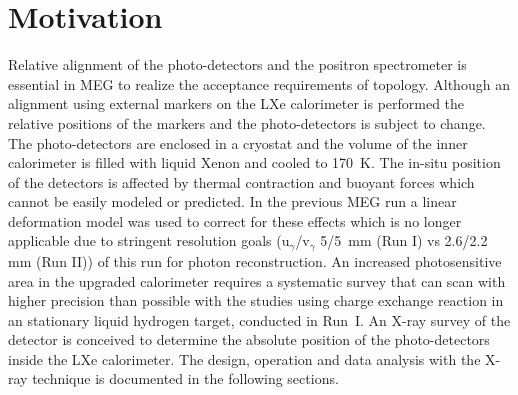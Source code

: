 \section{\label{motivation}Motivation}
Relative alignment of the photo-detectors and the positron
spectrometer is essential in MEG to realize the acceptance
requirements of \mueg topology.  Although an alignment
using external markers on the LXe calorimeter is performed the
relative positions of the markers and the photo-detectors is
subject to change. The photo-detectors are enclosed in a
cryostat and the volume of the inner 
calorimeter is filled with liquid Xenon and cooled to 170~K. 
The in-situ position of the
detectors is affected by thermal contraction and buoyant
forces which cannot be easily modeled or predicted. In the
previous MEG run a linear deformation model was used to
correct for these effects which is no longer applicable due
to stringent resolution goals\cite{megdesign,megproposal}
(u$_\gamma$/v$_\gamma$ 5/5~mm (Run I) vs 2.6/2.2 mm (Run II))
of this run for photon reconstruction.  An increased photosensitive
area in the upgraded calorimeter requires a systematic survey
that can scan with higher precision than possible with the
studies using charge exchange reaction \cex in an stationary
liquid hydrogen target, conducted in Run~I.  An X-ray survey of
the detector is conceived to determine the absolute position
of the photo-detectors inside the LXe calorimeter. The design,
operation and data analysis with the X-ray technique is
documented in the following sections.



